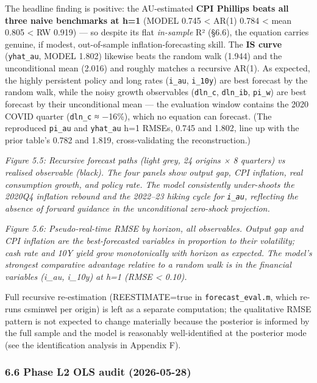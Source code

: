 \documentclass[
]{article}
\begin{document}
The headline finding is positive: the AU-estimated \textbf{CPI Phillips
beats all three naive benchmarks at h=1} (MODEL 0.745 \textless{} AR(1)
0.784 \textless{} mean 0.805 \textless{} RW 0.919) --- so despite its
flat \emph{in-sample} R² (§6.6), the equation carries genuine, if
modest, out-of-sample inflation-forecasting skill. The \textbf{IS curve}
(\texttt{yhat\_au}, MODEL 1.802) likewise beats the random walk (1.944)
and the unconditional mean (2.016) and roughly matches a recursive
AR(1). As expected, the highly persistent policy and long rates
(\texttt{i\_au}, \texttt{i\_10y}) are best forecast by the random walk,
while the noisy growth observables (\texttt{dln\_c}, \texttt{dln\_ib},
\texttt{pi\_w}) are best forecast by their unconditional mean --- the
evaluation window contains the 2020 COVID quarter (\texttt{dln\_c} ≈
−16\%), which no equation can forecast. (The reproduced \texttt{pi\_au}
and \texttt{yhat\_au} h=1 RMSEs, 0.745 and 1.802, line up with the prior
table's 0.782 and 1.819, cross-validating the reconstruction.)

\emph{Figure 5.5: Recursive forecast paths (light grey, 24 origins × 8
quarters) vs realised observable (black). The four panels show output
gap, CPI inflation, real consumption growth, and policy rate. The model
consistently under-shoots the 2020Q4 inflation rebound and the 2022--23
hiking cycle for \texttt{i\_au}, reflecting the absence of forward
guidance in the unconditional zero-shock projection.}

\emph{Figure 5.6: Pseudo-real-time RMSE by horizon, all observables.
Output gap and CPI inflation are the best-forecasted variables in
proportion to their volatility; cash rate and 10Y yield grow
monotonically with horizon as expected. The model's strongest
comparative advantage relative to a random walk is in the financial
variables (i\_au, i\_10y) at h=1 (RMSE \textless{} 0.10).}

Full recursive re-estimation (REESTIMATE=true in
\texttt{forecast\_eval.m}, which re-runs csminwel per origin) is left as
a separate computation; the qualitative RMSE pattern is not expected to
change materially because the posterior is informed by the full sample
and the model is reasonably well-identified at the posterior mode (see
the identification analysis in Appendix F).

\subsubsection{6.6 Phase L2 OLS audit
(2026-05-28)}\label{phase-l2-ols-audit-2026-05-28}
\end{document}
